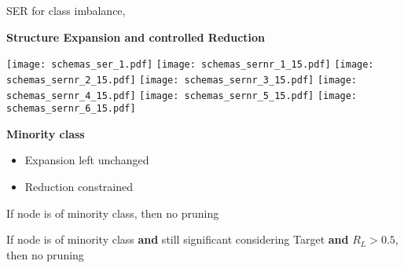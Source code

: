 \begin{frame}{SER for class imbalance}{\serr, \serll}
\begin{minipage}[t]{0.49\linewidth}
    \vspace{0pt}
    
    \centering
    \textbf{Structure Expansion and controlled Reduction}\\
        
    \renewcommand{\ratio}{0.8}
    \begin{overprint}
        \texttt{[image: schemas\_ser\_1.pdf]}
        \texttt{[image: schemas\_sernr\_1\_15.pdf]}
        \texttt{[image: schemas\_sernr\_2\_15.pdf]}
        \texttt{[image: schemas\_sernr\_3\_15.pdf]}
        \texttt{[image: schemas\_sernr\_4\_15.pdf]}
        \texttt{[image: schemas\_sernr\_5\_15.pdf]}
        \texttt{[image: schemas\_sernr\_6\_15.pdf]}
    \end{overprint}
    \pause
    \textcolor{mygreen}{\textbf{Minority class}}
\end{minipage}\hfill
\begin{minipage}[t]{0.49\linewidth}
    \vspace{0pt}
    \vspace{1.5cm}
    \begin{itemize}
    \pause \pause
    \item Expansion left unchanged
    \pause
    \item Reduction constrained
    \end{itemize}
\begin{minipage}[t]{0.49\linewidth}
    \vspace{0pt}
    \begin{tcolorbox}[title=\serr,size=title,boxrule=0.2pt]
    If node is of minority class, then no pruning
    \end{tcolorbox}
\end{minipage}
\begin{minipage}[t]{0.49\linewidth}
    \vspace{0pt}
    \begin{tcolorbox}[title=\serll,size=title,boxrule=0.2pt]
    If node is of minority class \textbf{and} still significant considering Target \textbf{and} $R_L > 0.5$, then no pruning
    \end{tcolorbox}
\end{minipage}


    

\end{minipage}

\end{frame}


